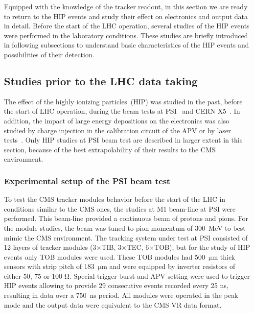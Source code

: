 Equipped with the knowledge of the tracker readout, in this section we are ready to return to the HIP events and study their effect on electronics and output data in detail. Before the start of the LHC operation, several studies of the HIP events were performed in the laboratory conditions. These studies are briefly introduced in following subsections to understand basic characteristics of the HIP events and possibilities of their detection. 


\subsection{Studies prior to the LHC data taking~\label{sec:HIPinPast}}

The effect of the highly ionizing particles~(HIP) was studied in the past, before the start of LHC operation, during the beam tests at PSI~\cite{Tomalin:2003aaa} and CERN X5~\cite{Bainbridge:2002bda}. In addition, the impact of large energy depositions on the electronics was also studied by charge injection in the calibration circuit of the APV or by laser tests~\cite{Adam:2005pz}. Only HIP studies at PSI beam test are described in larger extent in this section, because of the best extrapolability of their results to the CMS environment.

\subsubsection{Experimental setup of the PSI beam test}

To test the CMS tracker modules behavior before the start of the LHC in conditions similar to the CMS ones, the studies at M1 beam-line at PSI were performed. This beam-line provided a continuous beam of protons and pions. For the module studies, the beam was tuned to pion momentum of 300~MeV to best mimic the CMS environment. The tracking system under test at PSI consisted of 12 layers of tracker modules (3$\times$TIB, 3$\times$TEC, 6$\times$TOB), but for the study of HIP events only TOB modules were used. These TOB modules had 500~$\mathrm{\mu m}$ thick sensors with strip pitch of 183~$\mathrm{\mu}$m and were equipped by inverter resistors of either 50, 75 or 100 $\mathrm{\Omega}$. Special trigger burst and APV setting were used to trigger HIP events allowing to provide 29 consecutive events recorded every 25 ns, resulting in data over a 750~ns period. All modules were operated in the peak mode and the output data were equivalent to the CMS VR data format. 


